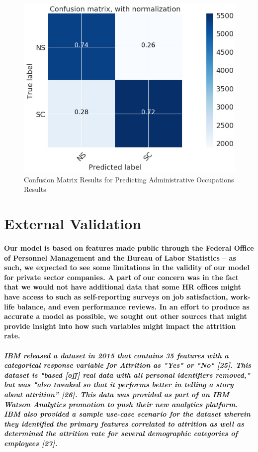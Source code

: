 \documentclass{article}
\begin{document}
\subparagraph{}
\begin{figure}[H]
\centering
\includegraphics[width=\linewidth]{AdminLRConfus.jpg}
\caption{Confusion Matrix Results for Predicting Administrative Occupations Results}
\label{fig:AdminLRConfus}
\end{figure}

\section{External Validation}

\paragraph{Our model is based on features made public through the Federal Office of Personnel Management and the Bureau of Labor Statistics – as such, we expected to see some limitations in the validity of our model for private sector companies. A part of our concern was in the fact that we would not have additional data that some HR offices might have access to such as self-reporting surveys on job satisfaction, work-life balance, and even performance reviews. In an effort to produce as accurate a model as possible, we sought out other sources that might provide insight into how such variables might impact the attrition rate.}

\subparagraph{IBM released a dataset in 2015 that contains 35 features with a categorical response variable for Attrition as "Yes" or "No" [25]. This dataset is "based [off] real data with all personal identifiers removed," but was "also tweaked so that it performs better in telling a story about attrition” [26]. This data was provided as part of an IBM Watson Analytics promotion to push their new analytics platform. IBM also provided a sample use-case scenario for the dataset wherein they identified the primary features correlated to attrition as well as determined the attrition rate for several demographic categories of employees [27].}
\end{document}
